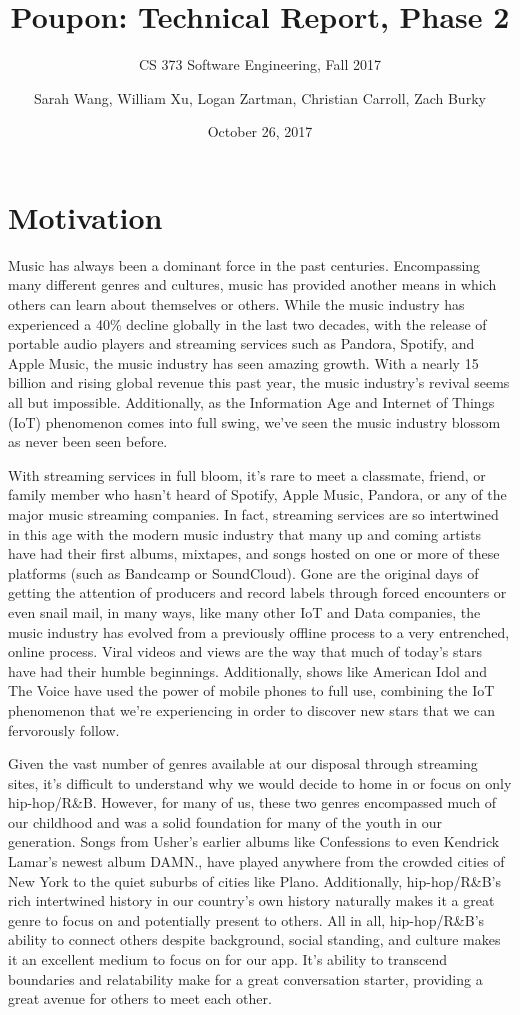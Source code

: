 \documentclass{scrartcl}
\title{Poupon: Technical Report, Phase 2}
\subtitle{CS 373 Software Engineering, Fall 2017}
\author{Sarah Wang, William Xu, Logan Zartman, Christian Carroll, Zach Burky}
\date{October 26, 2017}
\begin{document}
    \maketitle

    \tableofcontents

    \newpage
    \section{Motivation}
    \indent
    Music has always been a dominant force in the past centuries. Encompassing many different genres and cultures, music has provided another means in which others can learn about themselves or others. While the music industry has experienced a 40\% decline globally in the last two decades, with the release of portable audio players and streaming services such as Pandora, Spotify, and Apple Music, the music industry has seen amazing growth. With a nearly 15 billion and rising global revenue this past year, the music industry’s revival seems all but impossible. Additionally, as the Information Age and Internet of Things (IoT) phenomenon comes into full swing, we’ve seen the music industry blossom as never been seen before.

    With streaming services in full bloom, it’s rare to meet a classmate, friend, or family member who hasn’t heard of Spotify, Apple Music, Pandora, or any of the major music streaming companies. In fact, streaming services are so intertwined in this age with the modern music industry that many up and coming artists have had their first albums, mixtapes, and songs hosted on one or more of these platforms (such as Bandcamp or SoundCloud). Gone are the original days of getting the attention of producers and record labels through forced encounters or even snail mail, in many ways, like many other IoT and Data companies, the music industry has evolved from a previously offline process to a very entrenched, online process. Viral videos and views are the way that much of today’s stars have had their humble beginnings. Additionally, shows like American Idol and The Voice have used the power of mobile phones to full use, combining the IoT phenomenon that we're experiencing in order to discover new stars that we can fervorously follow.

    Given the vast number of genres available at our disposal through streaming sites, it’s difficult to understand why we would decide to home in or focus on only hip-hop/R\&B. However, for many of us, these two genres encompassed much of our childhood and was a solid foundation for many of the youth in our generation. Songs from Usher’s earlier albums like Confessions to even Kendrick Lamar’s newest album DAMN., have played anywhere from the crowded cities of New York to the quiet suburbs of cities like Plano. Additionally, hip-hop/R\&B’s rich intertwined history in our country’s own history naturally makes it a great genre to focus on and potentially present to others. All in all, hip-hop/R\&B’s ability to connect others despite background, social standing, and culture makes it an excellent medium to focus on for our app. It’s ability to transcend boundaries and relatability make for a great conversation starter, providing a great avenue for others to meet each other.
\end{document}
